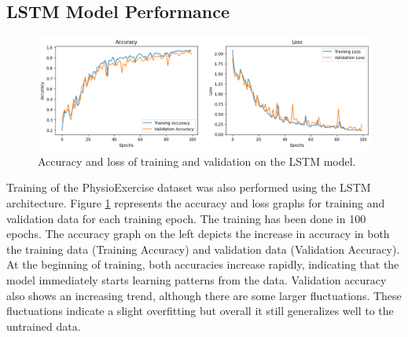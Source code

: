 \subsection{LSTM Model Performance}
\label{subsec4:LSTMPerformance}

\begin{figure}[h!]
	\centering
	\includegraphics[width=1\textwidth]{bab4/ar_LSTM_AccLoss.png}
	\caption{Accuracy and loss of training and validation on the LSTM model.}
	\label{fig:LSTM_AccLoss}
\end{figure}

Training of the PhysioExercise dataset was also performed using the LSTM architecture. Figure \ref{fig:LSTM_AccLoss} represents the accuracy and loss graphs for training and validation data for each training epoch. The training has been done in 100 epochs. The accuracy graph on the left depicts the increase in accuracy in both the training data (Training Accuracy) and validation data (Validation Accuracy). At the beginning of training, both accuracies increase rapidly, indicating that the model immediately starts learning patterns from the data. Validation accuracy also shows an increasing trend, although there are some larger fluctuations. These fluctuations indicate a slight overfitting but overall it still generalizes well to the untrained data.

